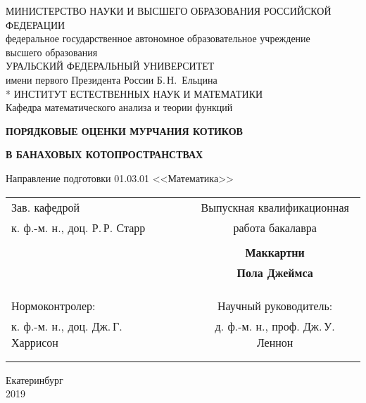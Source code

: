 \documentclass[a4paper,12pt]{article}
\begin{document}
\begin{titlepage}
	\thispagestyle{empty}
	\centering
	\smallskip
	\begin{center}
		МИНИСТЕРСТВО НАУКИ И ВЫСШЕГО ОБРАЗОВАНИЯ РОССИЙСКОЙ\\
		ФЕДЕРАЦИИ\\
		федеральное государственное автономное образовательное учреждение\\
		высшего образования\\
		УРАЛЬСКИЙ ФЕДЕРАЛЬНЫЙ УНИВЕРСИТЕТ\\
		имени первого Президента России Б.\,Н.~Ельцина\\*
		\bigskip
		ИНСТИТУТ ЕСТЕСТВЕННЫХ НАУК И МАТЕМАТИКИ\\
		\vspace{2cm}
		Кафедра математического анализа и теории функций\\
	\end{center}
	\vspace{1cm}
	\centerline{\bf{ПОРЯДКОВЫЕ ОЦЕНКИ МУРЧАНИЯ КОТИКОВ}}
	\centerline{\bf{В БАНАХОВЫХ КОТОПРОСТРАНСТВАХ}}
	\bigskip
	\centerline{Направление подготовки 01.03.01 <<Математика>>}
	\vspace{3cm}
	
	\begin{tabular}{lcc}
	    Зав. кафедрой & \hspace{1cm} & Выпускная квалификационная\\
        к. ф.-м. н., доц. Р.\,Р. Старр & \hspace{1cm}  & работа бакалавра\\
        & \hspace{1cm} &\\
	   \makebox[6cm]{\hrulefill} & \hspace{1cm} & {\bf Маккартни}\\
	    & \hspace{1cm} & {\bf Пола Джеймса}\\
	    & \hspace{1cm} &\\
	    & \hspace{1cm} & \makebox[6cm]{\hrulefill} \\
	    & \hspace{1cm} &\\
	    Нормоконтролер: & \hspace{1cm} & Научный руководитель:\\
	    к. ф.-м. н., доц. Дж.\,Г. Харрисон & \hspace{1cm} & д. ф.-м. н., проф. Дж.\,У. Леннон  \\
	    & \hspace{1cm} &\\
	   \makebox[6cm]{\hrulefill} & \hspace{1cm} & \makebox[6cm]{\hrulefill} \\
	\end{tabular}

	\vfill
	Екатеринбург  \\
	2019
\end{titlepage}
\end{document}
